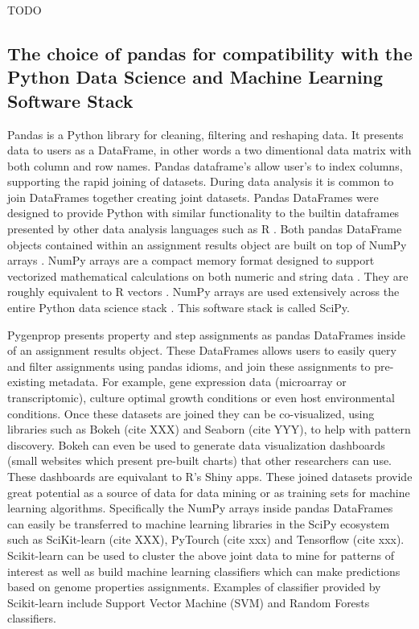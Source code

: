 \subsubsection{}

TODO

\subsection{The choice of pandas for compatibility with the Python Data Science and Machine Learning Software Stack}

Pandas is a Python library for cleaning, filtering and reshaping data. It presents data to users as a DataFrame, in other words a two dimentional data matrix with both column and row names. Pandas dataframe's allow user's to index columns, supporting the rapid joining of datasets. During data analysis it is common to join DataFrames together creating joint datasets. Pandas DataFrames were designed to provide Python with similar functionality to the builtin dataframes presented by other data analysis languages such as R \cite{rprogman}. Both pandas DataFrame objects contained within an assignment results object are built on top of NumPy arrays \cite{mckinney2010data}. NumPy arrays are a compact memory format designed to support vectorized mathematical calculations on both numeric and string data \cite{van2011numpy}. They are roughly equivalent to R vectors \cite{rprogman}. NumPy arrays are used extensively across the entire Python data science stack \cite{scipystack}. This software stack is called SciPy.

Pygenprop presents property and step assignments as pandas DataFrames inside of an assignment results object. These DataFrames allows users to easily query and filter assignments using pandas idioms, and join these assignments to pre-existing metadata.  For example, gene expression data (microarray or transcriptomic), culture optimal growth conditions or even host environmental conditions. Once these datasets are joined they can be co-visualized, using libraries such as Bokeh (cite XXX) and Seaborn (cite YYY), to help with pattern discovery. Bokeh can even be used to generate data visualization dashboards (small websites which present pre-built charts) that other researchers can use. These dashboards are equivalant to R's Shiny apps. These joined datasets provide great potential as a source of data for data mining or as training sets for machine learning algorithms. Specifically the NumPy arrays inside pandas DataFrames can easily be transferred to machine learning libraries in the SciPy ecosystem such as SciKit-learn (cite XXX), PyTourch (cite xxx) and Tensorflow (cite xxx). Scikit-learn can be used to cluster the above joint data to mine for patterns of interest as well as build machine learning classifiers which can make predictions based on genome properties assignments. Examples of classifier provided by Scikit-learn include Support Vector Machine (SVM) and Random Forests classifiers.

